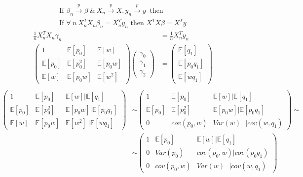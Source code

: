 \documentclass[a4paper]{article}
\newcommand{\expect}{\mathbb{E}}
\begin{document}
\begin{enumerate}[(a)]
	\begin{align*}
	\text{If } \beta_n \overset{p}{\to} \beta\ \&\ X_n \overset{p}{\to} X, y_n \overset{p}{\to} y\ \text{ then }\\
	\text{If } \forall\ n\ X_n^TX_n\beta_n = X^T_ny_n\text{ then } X^TX \beta = X^Ty
	\end{align*}
	\begin{align*}
	\frac{1}{n} X^T_nX_n \gamma_n &= \frac{1}{n}X_n^Ty_n\\
	\begin{pmatrix}
	1 & \expect[p_0] & \expect[w]\\
	\expect[p_0] & \expect[p_0^2] & \expect[p_0w]\\
	\expect[w] & \expect[p_0w] & \expect[w^2]
	\end{pmatrix} \begin{pmatrix}
	\gamma_0\\
	\gamma_1\\
	\gamma_2
	\end{pmatrix} &= \begin{pmatrix}
	\expect[q_1]\\\expect[p_0q_1]\\
	\expect[wq_1]
	\end{pmatrix}\\
	\end{align*}
	\begin{align*}
	\begin{pmatrix}
	1 & \expect[p_0] & \expect[w] \bigg| \expect[q_1]\\
	\expect[p_0] & \expect[p_0^2] & \expect[p_0w]\bigg| \expect[p_0q_1]\\
	\expect[w] & \expect[p_0w] & \expect[w^2]\ \bigg|\expect[wq_1]
	\end{pmatrix} &\sim \begin{pmatrix}
	1 & \expect[p_0] & \expect[w] \bigg| \expect[q_1]\\
	\expect[p_0] & \expect[p_0^2] & \expect[p_0w]\bigg| \expect[p_0q_1]\\
	0 & cov(p_0,w) & Var(w)\ \ \  \bigg|cov(w,q_1)
	\end{pmatrix} \sim \\
	&\sim \begin{pmatrix}
	1 & \expect[p_0] & \expect[w] \bigg| \expect[q_1]\\
	0 & Var(p_0) & cov(p_0, w)\bigg| cov(p_0q_1)\\
	0 & cov(p_0, w) & Var(w)\ \ \ \bigg|cov(w, q_1)
	\end{pmatrix} 
	\end{align*}

\end{enumerate}
\end{document}
